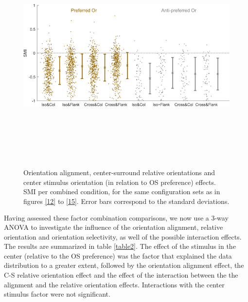 \begin{figure}[H] \centering \includegraphics[width=12cm,height=12cm,keepaspectratio]{Figures/7.Results/finalPopulation/sel/popPlots_VisROIs_COS_2SalignmentAngle.png} 
\caption{Orientation alignment, center-surround relative orientations and center stimulus orientation (in relation to OS preference) effects. SMI per combined condition, for the same configuration sets as in figures \ref{12} to \ref{15}. Error bars correspond to the standard deviations.} \label{anova2}
\end{figure}

Having assessed these factor combination comparisons, we now use a 3-way ANOVA to investigate the influence of the orientation alignment, relative orientation and orientation selectivity, as well of the possible interaction effects. The results are summarized in table \ref{table2}. The effect of the stimulus in the center (relative to the OS preference) was the factor that explained the data distribution to a greater extent, followed by the orientation alignment effect, the C-S relative orientation effect and the effect of the interaction between the the alignment and the relative orientation effects. Interactions with the center stimulus factor were not significant.

